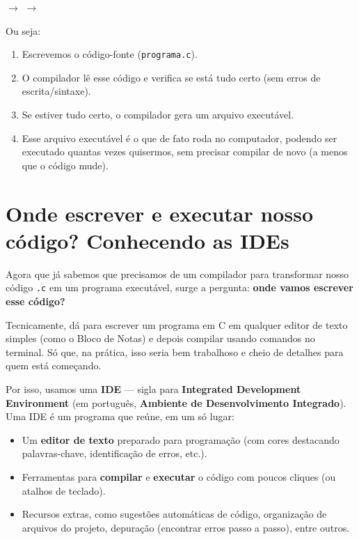 \begin{center}
     $\rightarrow$ \fbox{\textcolor{verdeC}{Compilador}} $\rightarrow$ 
\end{center}

Ou seja:
\begin{enumerate}
    \item Escrevemos o código-fonte (\texttt{programa.c}).
    \item O compilador lê esse código e verifica se está tudo certo (sem erros de escrita/sintaxe).
    \item Se estiver tudo certo, o compilador gera um arquivo executável.
    \item Esse arquivo executável é o que de fato roda no computador, podendo ser executado quantas vezes quisermos, sem precisar compilar de novo (a menos que o código mude).
\end{enumerate}

\section{\textcolor{azulPrincipal}{Onde escrever e executar nosso código? Conhecendo as IDEs}}

Agora que já sabemos que precisamos de um compilador para transformar nosso código \texttt{.c} em um programa executável, surge a pergunta: \textbf{onde vamos escrever esse código?}

Tecnicamente, dá para escrever um programa em C em qualquer editor de texto simples (como o Bloco de Notas) e depois compilar usando comandos no terminal. Só que, na prática, isso seria bem trabalhoso e cheio de detalhes para quem está começando.

Por isso, usamos uma \textbf{IDE} --- sigla para \textbf{Integrated Development Environment} (em português, \textbf{Ambiente de Desenvolvimento Integrado}). Uma IDE é um programa que reúne, em um só lugar:

\begin{destacado}
\begin{itemize}
    \item Um \textbf{editor de texto} preparado para programação (com cores destacando palavras-chave, identificação de erros, etc.).
    \item Ferramentas para \textbf{compilar} e \textbf{executar} o código com poucos cliques (ou atalhos de teclado).
    \item Recursos extras, como sugestões automáticas de código, organização de arquivos do projeto, depuração (encontrar erros passo a passo), entre outros.
\end{itemize}
\end{destacado}

